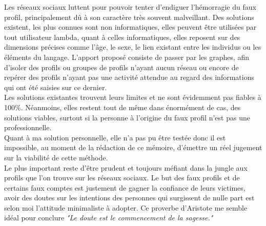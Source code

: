 \documentclass[12pt]{report}
\begin{document}
Les réseaux sociaux luttent pour pouvoir tenter d'endiguer l'hémorragie du faux profil, principalement dû à son caractère très souvent malveillant. Des solutions existent, les plus connues sont non informatiques, elles peuvent être utilisées par tout utilisateur lambda, quant à celles informatiques, elles reposent sur des dimensions précises comme l'âge, le sexe, le lien existant entre les individus ou les éléments du langage. L'apport proposé consiste de passer par les graphes, afin d'isoler des profils ou groupes de profils n'ayant aucun réseau ou encore de repérer des profils n'ayant pas une activité attendue au regard des informations qui ont été saisies sur ce dernier.\\

Les solutions existantes trouvent leurs limites et ne sont évidemment pas fiables à 100\%. Néanmoins, elles restent tout de même dans énormément de cas, des solutions viables, surtout si la personne à l'origine du faux profil n'est pas une professionnelle.\\
Quant à ma solution personnelle, elle n'a pas pu être testée donc il est impossible, au moment de la rédaction de ce mémoire, d'émettre un réel jugement sur la viabilité de cette méthode. \\

Le plus important reste d'être prudent et toujours méfiant dans la jungle aux profils que l'on trouve sur les réseaux sociaux. Le but des faux profils et de certains faux comptes est justement de gagner la confiance de leurs victimes, avoir des doutes sur les intentions des personnes qui surgissent de nulle part est selon moi l'attitude minimaliste à adopter. Ce proverbe d'Aristote me semble idéal pour conclure \textit {"Le doute est le commencement de la sagesse."}

\nocite{*}
\printbibliography
\end{document}
